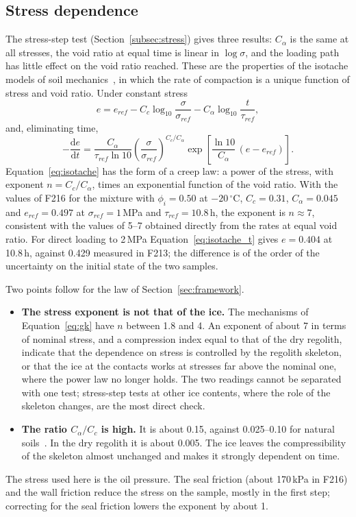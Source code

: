 \subsection{Stress dependence}
\label{subsec:cal_stress}

The stress-step test (Section~\ref{subsec:stress}) gives three results: $C_\alpha$ is the same at all stresses, the void ratio at equal time is linear in $\log\sigma$, and the loading path has little effect on the void ratio reached. These are the properties of the isotache models of soil mechanics~\cite{bjerrum1967,mesri1977}, in which the rate of compaction is a unique function of stress and void ratio. Under constant stress
\begin{equation}
    e = e_{ref} - C_c\log_{10}\frac{\sigma}{\sigma_{ref}} - C_\alpha\log_{10}\frac{t}{\tau_{ref}},
    \label{eq:isotache_t}
\end{equation}
and, eliminating time,
\begin{equation}
    -\frac{\mathrm{d}e}{\mathrm{d}t} = \frac{C_\alpha}{\tau_{ref}\ln10}\left(\frac{\sigma}{\sigma_{ref}}\right)^{C_c/C_\alpha}\exp\!\left[\frac{\ln10}{C_\alpha}\,(e - e_{ref})\right].
    \label{eq:isotache}
\end{equation}
Equation~\eqref{eq:isotache} has the form of a creep law: a power of the stress, with exponent $n = C_c/C_\alpha$, times an exponential function of the void ratio. With the values of F216 for the mixture with $\phi_i = 0.50$ at $-20\,^\circ$C, $C_c = 0.31$, $C_\alpha = 0.045$ and $e_{ref} = 0.497$ at $\sigma_{ref} = 1$\,MPa and $\tau_{ref} = 10.8$\,h, the exponent is $n\approx7$, consistent with the values of 5--7 obtained directly from the rates at equal void ratio. For direct loading to 2\,MPa Equation~\eqref{eq:isotache_t} gives $e = 0.404$ at 10.8\,h, against 0.429 measured in F213; the difference is of the order of the uncertainty on the initial state of the two samples.

Two points follow for the law of Section~\ref{sec:framework}.
\begin{itemize}
    \item \textbf{The stress exponent is not that of the ice.} The mechanisms of Equation~\eqref{eq:gk} have $n$ between 1.8 and 4. An exponent of about 7 in terms of nominal stress, and a compression index equal to that of the dry regolith, indicate that the dependence on stress is controlled by the regolith skeleton, or that the ice at the contacts works at stresses far above the nominal one, where the power law no longer holds. The two readings cannot be separated with one test; stress-step tests at other ice contents, where the role of the skeleton changes, are the most direct check.
    \item \textbf{The ratio $C_\alpha/C_c$ is high.} It is about 0.15, against 0.025--0.10 for natural soils~\cite{mesri1977}. In the dry regolith it is about 0.005. The ice leaves the compressibility of the skeleton almost unchanged and makes it strongly dependent on time.
\end{itemize}
The stress used here is the oil pressure. The seal friction (about 170\,kPa in F216) and the wall friction reduce the stress on the sample, mostly in the first step; correcting for the seal friction lowers the exponent by about 1.

